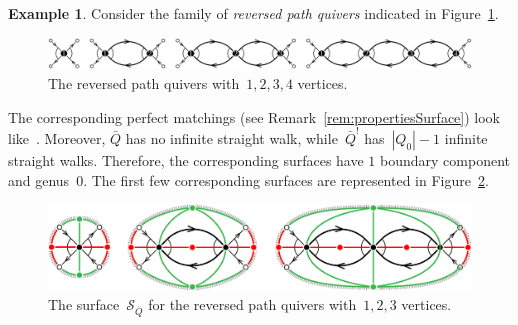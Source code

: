 \documentclass{amsart}
\theoremstyle{definition}
\newtheorem{example}[theorem]{Example}
\newcommand{\fref}[1]{Figure~\ref{#1}} %
\newcommand{\darkblue}{\color{darkblue}} %
\newcommand{\defn}[1]{\textsl{\darkblue #1}} %
\newcommand{\surface}{\mathcal{S}} %
\newcommand{\koszul}{^!} %
\begin{document}
\begin{example}
\label{exm:reversedPath}
Consider the family of \defn{reversed path quivers} indicated in \fref{fig:reversedPathsQuivers}.

\begin{figure}[h]
	\capstart
	\centerline{\includegraphics[scale=.45]{reversedPathsQuivers}}
	\caption{The reversed path quivers with~$1, 2, 3, 4$ vertices.}
	\label{fig:reversedPathsQuivers}
\end{figure}

The corresponding perfect matchings (see Remark~\ref{rem:propertiesSurface}) look like~.
Moreover, $\bar Q$ has no infinite straight walk, while~$\bar Q\koszul$ has~$|Q_0|-1$ infinite straight walks.
Therefore, the corresponding surfaces have $1$ boundary component and genus~$0$.
The first few corresponding surfaces are represented in \fref{fig:reversedPathsSurfaces}.

\begin{figure}[h]
	\capstart
	\centerline{\includegraphics[scale=.7]{reversedPathsSurfaces3}}
	\caption{The surface~$\surface_{\bar Q}$ for the reversed path quivers with~$1, 2, 3$ vertices.}
	\label{fig:reversedPathsSurfaces}
\end{figure}

\end{example}
\end{document}
